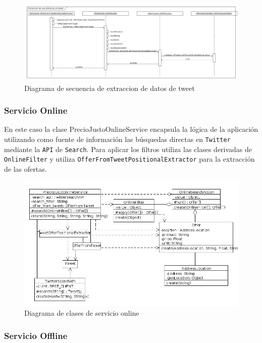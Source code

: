 \begin{figure}[h]
\centerline{\includegraphics[width=0.9\paperwidth]{./imgs/sequence_diagram_parsing.png}}
\caption{Diagrama de secuencia de extraccion de datos de tweet}
\label{fig:secuence_parsing}
\end{figure}

\subsubsection{Servicio Online}
En este caso la clase PrecioJustoOnlineService encapsula la l\'ogica de la aplicaci\'on utilizando como fuente de informaci\'on las b\'usquedas directas en \texttt{Twitter} mediante la \texttt{API} de \texttt{Search}.
Para aplicar los filtros utiliza las clases derivadas de \texttt{OnlineFilter} y utiliza \texttt{OfferFromTweetPositionalExtractor} para la extracci\'on de las ofertas.

\begin{figure}[h]
\centerline{\includegraphics[width=0.9\paperwidth]{./imgs/class_diagram_online_service.png}}
\caption{Diagrama de clases de servicio online}
\label{fig:class_online_service}
\end{figure}

\subsubsection{Servicio Offline}

